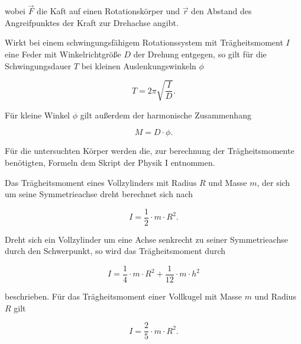 \noindent wobei $\vec{F}$ die Kaft auf einen
Rotationskörper und $\vec{r}$ den Abstand des 
Angreifpunktes der Kraft zur Drehachse angibt.

Wirkt bei einem schwingungsfähigem Rotationssystem
mit Trägheitsmoment $I$
eine Feder mit Winkelrichtgröße $D$ der Drehung entgegen,
so gilt für die Schwingungsdauer $T$ bei kleinen 
Auslenkungswinkeln $\phi$

\begin{equation}
    T=2\pi \sqrt{\frac{I}{D}}.
    \label{eq:fa2}
\end{equation}

\noindent Für kleine Winkel $\phi$ gilt außerdem der
harmonische Zusammenhang

\begin{equation}
    M=D \cdot \phi.
    \label{eq:fa3}
\end{equation}

\noindent Für die untersuchten Körper werden 
die, zur berechnung der Trägheitsmomente benötigten,
Formeln dem Skript der Physik I \cite{Skript} entnommen.

Das Trägheitsmoment eines Vollzylinders mit Radius $R$
und Masse $m$, der sich um seine
Symmetrieachse dreht berechnet sich nach

\begin{equation}
    I=\frac{1}{2} \cdot m \cdot R^2.
    \label{eq:zyl1}
\end{equation}

\noindent Dreht sich ein Vollzylinder um eine Achse senkrecht
zu seiner Symmetrieachse durch den Schwerpunkt, so wird das Trägheitsmoment durch

\begin{equation}
    I=\frac{1}{4} \cdot m \cdot R^2 + \frac{1}{12} \cdot m \cdot h^2
    \label{eq:zyl2}
\end{equation}

\noindent beschrieben. Für das Trägheitsmoment einer
Vollkugel  mit Masse $m$ und Radius $R$ gilt

\begin{equation}
    I=\frac{2}{5} \cdot m \cdot R^2.
    \label{eq:Kugel}
\end{equation}